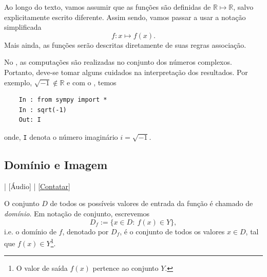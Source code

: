 \begin{obs}
  Ao longo do texto, vamos assumir que as funções são definidas de $\mathbb{R}\mapsto\mathbb{R}$, salvo explicitamente escrito diferente. Assim sendo, vamos passar a usar a notação simplificada
  \begin{equation}
    f:x\mapsto f(x).
  \end{equation}
  Mais ainda, as funções serão descritas diretamente de suas regras associação.
\end{obs}

\ifispython
\begin{obs}
  No {\sympy}, as computações são realizadas no conjunto dos números complexos. Portanto, deve-se tomar alguns cuidados na interpretação dos resultados. Por exemplo, $\sqrt{-1}\not\in\mathbb{R}$ e com o {\sympy}, temos
  \begin{lstlisting}
    In : from sympy import *
    In : sqrt(-1)
    Out: I
  \end{lstlisting}
  onde, \verb+I+ denota o número imaginário $i = \sqrt{-1}$.
\end{obs}
\fi

\subsection{Domínio e Imagem}

\begin{flushright}
  [Vídeo] | [Áudio] | \href{https://phkonzen.github.io/notas/contato.html}{[Contatar]}
\end{flushright}

O conjunto $D$ de todos os possíveis valores de entrada da função é chamado de \emph{domínio}. Em notação de conjunto, escrevemos
\begin{equation}
  D_f := \{x\in D:~f(x)\in Y\},
\end{equation}
i.e. o domínio de $f$, denotado por $D_f$, é o conjunto de todos os valores $x\in D$, tal que $f(x)\in Y$\footnote{O valor de saída $f(x)$ pertence ao conjunto $Y$.}.

